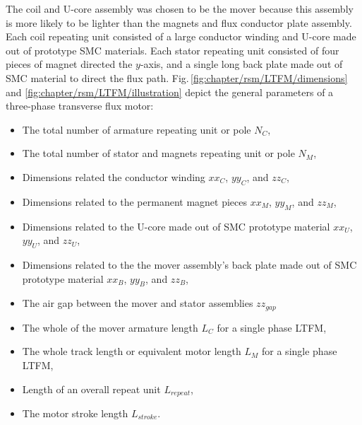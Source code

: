         
         The coil and U-core assembly was chosen to be the mover because this assembly is more likely to be lighter than the magnets and flux conductor plate assembly. Each coil repeating unit consisted of a large conductor winding and U-core made out of prototype \acs{SMC} materials. Each stator repeating unit consisted of four pieces of magnet directed the $y$-axis, and a single long back plate made out of \acs{SMC} material to direct the flux path. Fig.\,\ref{fig:chapter/rsm/LTFM/dimensions} and \ref{fig:chapter/rsm/LTFM/illustration} depict the general parameters of a three-phase transverse flux motor:
        
        \begin{itemize}
            \item The total number of armature repeating unit or pole $N_C$,
            \item The total number of stator and magnets repeating unit or pole $N_M$,
            \item Dimensions related the conductor winding $xx_C$, $yy_C$, and $zz_C$,
            \item Dimensions related to the permanent magnet pieces $xx_M$, $yy_M$, and $zz_M$,
            \item Dimensions related to the U-core made out of \acs{SMC} prototype material $xx_U$, $yy_U$, and $zz_U$,
            \item Dimensions related to the the mover assembly's back plate made out of \acs{SMC} prototype material $xx_B$, $yy_B$, and $zz_B$,
            \item The air gap between the mover and stator assemblies  $zz_{gap}$
            \item The whole of the mover armature length $L_{C}$ for a single phase \acs{LTFM},
            \item The whole track length or equivalent motor length $L_{M}$ for a single phase \acs{LTFM},
            \item Length of an overall repeat unit $L_{repeat}$,
            \item The motor stroke length $L_{stroke}$.
        \end{itemize}
        
